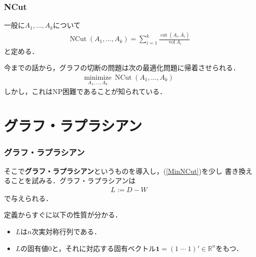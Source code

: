 \documentclass[10pt,hyperref={unicode}]{beamer}
\DeclareMathOperator*{\cut}{cut}
\DeclareMathOperator*{\vol}{vol}
\DeclareMathOperator*{\NCut}{NCut}
\newcommand{\pref}[1]{{\fontfamily{cmr}\selectfont (\ref{#1})}}
\newcommand{\parentheses}[1]{\left(#1\right)}
\begin{document}
\begin{frame}
\frametitle{NCut}
一般に$A_1,\ldots,A_k$について
\begin{align*}
    \NCut \parentheses{A_1,\ldots,A_k} = \sum_{i = 1}^k \frac{\cut\parentheses{A_i,\overline{A_i}}}{\vol A_i}
\end{align*}
と定める．

\bigskip

今までの話から，グラフの切断の問題は次の最適化問題に帰着させられる．
\begin{align}
    \underset{A_1,\ldots,A_k}{\mathrm{minimize}}\ \NCut\parentheses{A_1,\ldots,A_k} \label{MinNCut}
\end{align}
しかし，これはNP困難であることが知られている．
\end{frame}

\section{グラフ・ラプラシアン}
\begin{frame}
\frametitle{グラフ・ラプラシアン}
そこで\textbf{グラフ・ラプラシアン}というものを導入し，\pref{MinNCut}を少し
書き換えることを試みる．グラフ・ラプラシアンは
\begin{align*}
    L := D - W
\end{align*}
で与えられる．

\bigskip

定義からすぐに以下の性質が分かる．
\begin{itemize}
    \item $L$は$n$次実対称行列である．
    \item $L$の固有値$0$と，それに対応する固有ベクトル$\bm{1} = \parentheses{1 \; \cdots \; 1}' \in \mathbb{R}^n$をもつ．
\end{itemize}
\end{frame}

\end{document}
